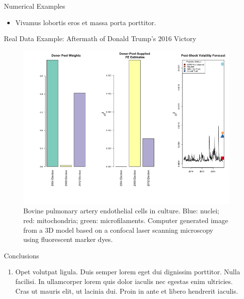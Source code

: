 \documentclass{beamer} %
\begin{document}
\begin{frame}[t]
\begin{columns}[t]
\begin{column}{0.465\textwidth}
\begin{block}{Numerical Examples}
	\bigskip\bigskip %
	
	\begin{itemize}
		\item Vivamus lobortis eros et massa porta porttitor.
	\end{itemize}
\end{block}


\begin{block}{Real Data Example: Aftermath of Donald Trump's 2016 Victory}
	\begin{figure}
		\includegraphics[width=\linewidth]{../real_data_output_plots/FriMay311830522024_IYG_None_2016-06-22.png}
		\caption{Bovine pulmonary artery endothelial cells in culture. Blue: nuclei; red: mitochondria; green: microfilaments. Computer generated image from a 3D model based on a confocal laser scanning microscopy using fluorescent marker dyes.}
	\end{figure}
\end{block}


\begin{block}{Conclusions}
	\begin{enumerate}
		\item \alert{Opet volutpat ligula.} Duis semper lorem eget dui dignissim porttitor. Nulla facilisi. In ullamcorper lorem quis dolor iaculis nec egestas enim ultricies. Cras ut mauris elit, ut lacinia dui. Proin in ante et libero hendrerit iaculis.
	\end{enumerate}
\end{block}


\end{column}
\end{columns}
\end{frame}
\end{document}

